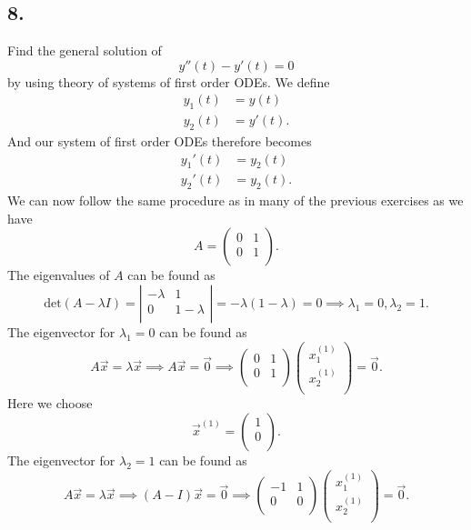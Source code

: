 \subsection*{8.} Find the general solution of
\[ 
y''(t) - y'(t) = 0
\]
by using theory of systems of first order ODEs.
\bigbreak
We define
\begin{align*}
  y_1(t) &= y(t) \\
  y_2(t) &= y'(t)
.\end{align*}
And our system of first order ODEs therefore becomes
\begin{align*}
  y_1'(t) &= y_2(t) \\
  y_2'(t) &= y_2(t)
.\end{align*}
We can now follow the same procedure as in many of the previous exercises as we have
\[ 
A = \begin{pmatrix}
0 & 1\\
0 & 1\\
\end{pmatrix}
.\]
The eigenvalues of $A$ can be found as
\[ 
\mathrm{det}(A - \lambda I) = \left| \begin{array}{cc}
-\lambda & 1\\
0 & 1 - \lambda\\
\end{array} \right| = -\lambda(1-\lambda) = 0 \implies \lambda_1 = 0, \lambda_2 = 1
.\]
The eigenvector for $\lambda_1 = 0$ can be found as
\[ 
A \Vec{x} = \lambda \Vec{x} \implies A \Vec{x} = \Vec{0} \implies \begin{pmatrix}
0 & 1\\
0 & 1\\
\end{pmatrix} \begin{pmatrix}
x_1^{(1)}\\
x_2^{(1)}\\
\end{pmatrix} = \Vec{0}
.\]
Here we choose
\[ 
\Vec{x}^{(1)} = \begin{pmatrix}
1\\
0\\
\end{pmatrix}
.\]
The eigenvector for $\lambda_2 = 1$ can be found as
\[ 
A \Vec{x} = \lambda \Vec{x} \implies (A - I) \Vec{x} = \Vec{0} \implies \begin{pmatrix}
-1 & 1\\
0 & 0\\
\end{pmatrix} \begin{pmatrix}
x_1^{(1)}\\
x_2^{(1)}\\
\end{pmatrix} = \Vec{0}
.\]
